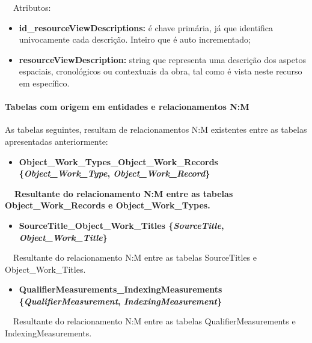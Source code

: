 \documentclass[letterpaper]{article}
\newcommand\liststyleLvi{%
\renewcommand\labelitemi{[27A2?]}
\renewcommand\labelitemii{[27A2?]}
\renewcommand\labelitemiii{[27A2?]}
\renewcommand\labelitemiv{[27A2?]}
}
\newcommand\liststyleLxv{%
\renewcommand\labelitemi{{\textbullet}}
\renewcommand\labelitemii{{\textbullet}}
\renewcommand\labelitemiii{{\textbullet}}
\renewcommand\labelitemiv{{\textbullet}}
}
\begin{document}
\bigskip

{
\ \ Atributos:}

\liststyleLvi
\begin{itemize}
\item {
\textbf{id\_resourceViewDescriptions}\textbf{:} \'e chave prim\'aria,
j\'a que identifica univocamente cada descri\c{c}\~ao. Inteiro que \'e
auto incrementado;}
\item {
\textbf{resourceViewDescription:} string que representa uma
descri\c{c}\~ao dos aspetos espaciais, cronol\'ogicos ou contextuais da
obra, tal como \'e vista neste recurso em espec\'ifico.}
\end{itemize}

\bigskip

\paragraph[Tabelas com origem em entidades e relacionamentos
N:M]{\bfseries Tabelas com origem em entidades
e relacionamentos N:M}
{
As tabelas seguintes, resultam de relacionamentos N:M existentes entre
as tabelas apresentadas anteriormente:}

\liststyleLxv
\begin{itemize}
\item {\bfseries
Object\_Work\_Types\_Object\_Work\_Records\textmd{
\{}\textmd{\textit{Object\_Work\_Type}}\textmd{,
}\textmd{\textit{Object\_Work\_Record}}\textmd{\}}}
\end{itemize}
{\bfseries
\ \ \textmd{Resultante do relacionamento N:M entre as tabelas
Object\_Work\_Records} \textmd{e Object\_Work\_Types.}}


\bigskip

\liststyleLxv
\begin{itemize}
\item {\bfseries
SourceTitle\_Object\_Work\_Titles\textmd{
\{}\textmd{\textit{SourceTitle}}\textmd{,
}\textmd{\textit{Object\_Work\_Title}}\textmd{\}}}
\end{itemize}
{
\ \ Resultante do relacionamento N:M entre as tabelas SourceTitles e
Object\_Work\_Titles.}


\bigskip

\liststyleLxv
\begin{itemize}
\item {\bfseries
QualifierMeasurements\_IndexingMeasurements\textmd{
\{}\textmd{\textit{QualifierMeasurement}}\textmd{,
}\textmd{\textit{IndexingMeasurement}}\textmd{\}}}
\end{itemize}
{
\ \ Resultante do relacionamento N:M entre as tabelas
QualifierMeasurements e IndexingMeasurements.}
\end{document}
